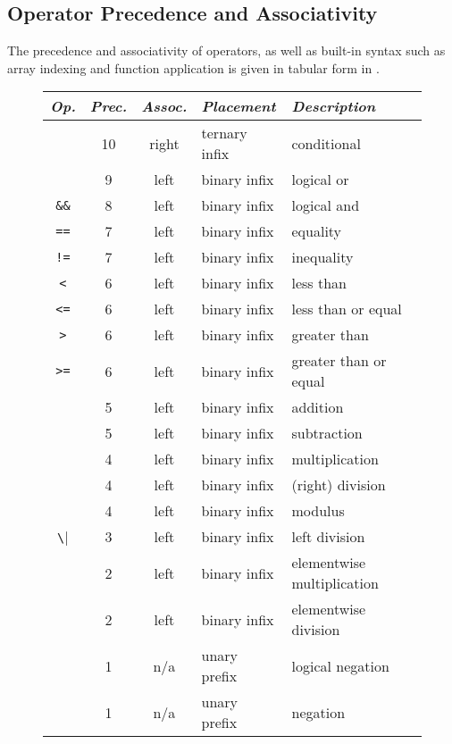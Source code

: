 \subsection{Operator Precedence and Associativity}

The precedence and associativity of operators, as well as built-in
syntax such as array indexing and function application is given in
tabular form in .
%
\begin{figure}
\begin{center}
\begin{tabular}{c|ccl|l}
{\it Op.} & {\it Prec.} & {\it Assoc.} & {\it
  Placement} & {\it Description}
\\ \hline \hline
\code{?~:} & 10 & right & ternary infix & conditional
\\ \hline
\code{||} & 9 & left & binary infix & logical or
\\ \hline
\Verb|&&| & 8 & left & binary infix & logical and
\\ \hline
\Verb|==| & 7 & left & binary infix & equality
\\
\Verb|!=| & 7 & left & binary infix & inequality
\\ \hline
\Verb|<| & 6 & left & binary infix & less than
\\
\Verb|<=| & 6 & left & binary infix & less than or equal
\\
\Verb|>| & 6 & left & binary infix & greater than
\\
\Verb|>=| & 6 & left & binary infix & greater than or equal
\\ \hline
\code{+} & 5 & left & binary infix & addition
\\
\code{-} & 5 & left & binary infix & subtraction
\\ \hline
\code{*} & 4 & left & binary infix & multiplication
\\
\code{/} & 4 & left & binary infix & (right) division
\\
\code{\%} & 4 & left & binary infix & modulus
\\ \hline
\Verb|\| & 3 & left & binary infix & left division
\\ \hline
\code{.*} & 2 & left & binary infix & elementwise multiplication
\\
\code{./} & 2 & left & binary infix & elementwise division
\\ \hline
\code{!} & 1 & n/a & unary prefix & logical negation
\\
\code{-} & 1 & n/a & unary prefix & negation
\\

\end{tabular}
\end{center}
\end{figure}

